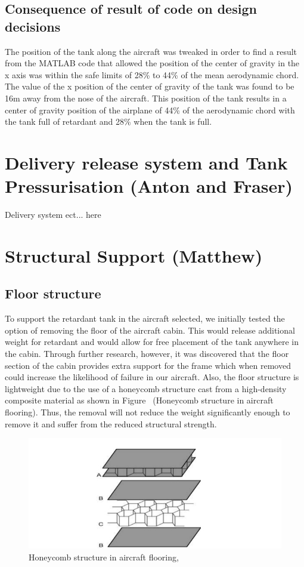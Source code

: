 \subsection{Consequence of result of code on design decisions}

The position of the tank along the aircraft was tweaked in order to find a result from the MATLAB code that allowed the position of the center of gravity in the x axis was within the safe limits of 28\% to 44\% of the mean aerodynamic chord.
The value of the x position of the center of gravity of the tank was found to be 16m away from the nose of the aircraft.
This position of the tank results in a center of gravity position of the airplane of 44\% of the aerodynamic chord with the tank full of retardant and 28\% when the tank is full. 

\section{Delivery release system and  Tank Pressurisation (Anton and Fraser)}
Delivery system ect... here
\section{Structural Support (Matthew)}

\subsection{Floor structure}

To support the retardant tank in the aircraft selected, we initially tested the option of removing the floor of the aircraft cabin. This would release additional weight for retardant and would allow for free placement of the tank anywhere in the cabin. Through further research, however, it was discovered that the floor section of the cabin provides extra support for the frame which when removed could increase the likelihood of failure in our aircraft. Also, the floor structure is lightweight due to the use of a honeycomb structure cast from a high-density composite material as shown in Figure  (Honeycomb structure in aircraft flooring). Thus, the removal will not reduce the weight significantly enough to remove it and suffer from the reduced structural strength. 

\begin{figure}[!htbp]
\centering
\includegraphics[width= \linewidth]{../figures/honeycomb_structure_in_aircraft_flooring.jpg}
  \caption{Honeycomb structure in aircraft flooring, \cite{ganesh2015design}}
\label{fig:honeycomb_structure_in_aircraft_flooring}
\end{figure}
\FloatBarrier

